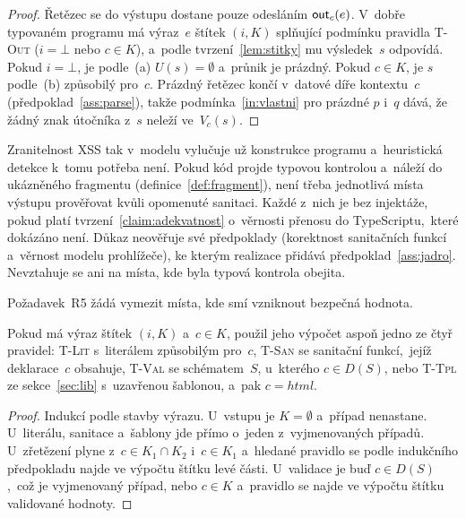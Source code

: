 \begin{proof}
Řetězec se do výstupu dostane pouze odesláním $\mathsf{out}_c(e)$. V~dobře typovaném programu má výraz~$e$ štítek $(i,K)$ splňující podmínku pravidla \textsc{T-Out} ($i = \bot$ nebo $c \in K$), a~podle tvrzení~\ref{lem:stitky} mu výsledek~$s$ odpovídá. Pokud $i = \bot$, je podle~(a) $U(s) = \emptyset$ a~průnik je prázdný. Pokud $c \in K$, je $s$ podle~(b) způsobilý pro~$c$. Prázdný řetězec končí v~datové díře kontextu~$c$ (předpoklad~\ref{ass:parse}), takže podmínka~\eqref{in:vlastni} pro prázdné $p$ i~$q$ dává, že žádný znak útočníka z~$s$ neleží ve~$V_c(s)$.
\end{proof}

Zranitelnost XSS tak v~modelu vylučuje už konstrukce programu a~heuristická detekce k~tomu potřeba není. Pokud kód projde typovou kontrolou a~náleží do ukázněného fragmentu (definice~\ref{def:fragment}), není třeba jednotlivá místa výstupu prověřovat kvůli opomenuté sanitaci. Každé z~nich je bez injektáže, pokud platí tvrzení~\ref{claim:adekvatnost} o~věrnosti přenosu do TypeScriptu,~které dokázáno není. Důkaz neověřuje své předpoklady (korektnost sanitačních funkcí a~věrnost modelu prohlížeče), ke kterým realizace přidává předpoklad~\ref{ass:jadro}. Nevztahuje se ani na místa, kde byla typová kontrola obejita.

Požadavek~R5 žádá vymezit místa, kde smí vzniknout bezpečná hodnota.

\begin{tvrzeni}
\label{thm:audit}
Pokud má výraz štítek $(i,K)$ a~$c \in K$, použil jeho výpočet aspoň jedno ze čtyř pravidel: \textup{\textsc{T-Lit}} s~literálem způsobilým pro~$c$, \textup{\textsc{T-San}} se sanitační funkcí,~jejíž deklarace~$c$ obsahuje, \textup{\textsc{T-Val}} se schématem~$S$, u~kterého $c \in D(S)$, nebo \textup{\textsc{T-Tpl}} ze sekce~\ref{sec:lib} s~uzavřenou šablonou, a~pak $c = \mathit{html}$.
\end{tvrzeni}

\begin{proof}
Indukcí podle stavby výrazu. U~vstupu je $K = \emptyset$ a~případ nenastane. U~literálu, sanitace a~šablony jde přímo o~jeden z~vyjmenovaných případů. U~zřetězení plyne z~$c \in K_1 \cap K_2$ i~$c \in K_1$ a~hledané pravidlo se podle indukčního předpokladu najde ve výpočtu štítku levé části. U~validace je buď $c \in D(S)$,~což je vyjmenovaný případ, nebo $c \in K$ a~pravidlo se najde ve výpočtu štítku validované hodnoty.
\end{proof}

